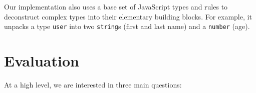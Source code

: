 \documentclass[letterpaper,twocolumn,10pt]{article}
\newcommand{\ttt}[1]{\texttt{#1}}
\newcommand{\sys}{{\scshape Lya}\xspace}
\begin{document}
Our implementation also uses a base set of JavaScript types and rules to deconstruct complex types into their elementary building blocks.
For example, it unpacks a type \ttt{user} into two \ttt{string}s (first and last name) and a \ttt{number} (age).



\section{Evaluation}
\label{eval}

At a high level, we are interested in three main questions:
\end{document}
